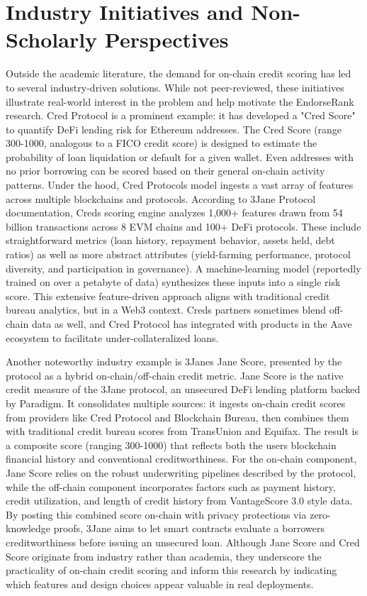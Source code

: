 \documentclass[
]{article}
\begin{document}
\section{Industry Initiatives and Non-Scholarly Perspectives}\label{industry-initiatives-and-non-scholarly-perspectives}

Outside the academic literature, the demand for on-chain credit scoring has led to several industry-driven solutions. While not peer-reviewed, these initiatives illustrate real-world interest in the problem and help motivate the EndorseRank research. Cred Protocol is a prominent example: it has developed a "Cred Score" to quantify DeFi lending risk for Ethereum addresses. The Cred Score (range 300-1000, analogous to a FICO credit score) is designed to estimate the probability of loan liquidation or default for a given wallet. Even addresses with no prior borrowing can be scored based on their general on-chain activity patterns. Under the hood, Cred Protocol\textquotesingle s model ingests a vast array of features across multiple blockchains and protocols. According to 3Jane Protocol documentation, Cred\textquotesingle s scoring engine analyzes 1,000+ features drawn from 54 billion transactions across 8 EVM chains and 100+ DeFi protocols. These include straightforward metrics (loan history, repayment behavior, assets held, debt ratios) as well as more abstract attributes (yield-farming performance, protocol diversity, and participation in governance). A machine-learning model (reportedly trained on over a petabyte of data) synthesizes these inputs into a single risk score. This extensive feature-driven approach aligns with traditional credit bureau analytics, but in a Web3 context. Cred\textquotesingle s partners sometimes blend off-chain data as well, and Cred Protocol has integrated with products in the Aave ecosystem to facilitate under-collateralized loans.

Another noteworthy industry example is 3Jane\textquotesingle s Jane Score, presented by the protocol as a hybrid on-chain/off-chain credit metric. Jane Score is the native credit measure of the 3Jane protocol, an unsecured DeFi lending platform backed by Paradigm. It consolidates multiple sources: it ingests on-chain credit scores from providers like Cred Protocol and Blockchain Bureau, then combines them with traditional credit bureau scores from TransUnion and Equifax. The result is a composite score (ranging 300-1000) that reflects both the user\textquotesingle s blockchain financial history and conventional creditworthiness. For the on-chain component, Jane Score relies on the robust underwriting pipelines described by the protocol, while the off-chain component incorporates factors such as payment history, credit utilization, and length of credit history from VantageScore 3.0 style data. By posting this combined score on-chain with privacy protections via zero-knowledge proofs, 3Jane aims to let smart contracts evaluate a borrower\textquotesingle s creditworthiness before issuing an unsecured loan. Although Jane Score and Cred Score originate from industry rather than academia, they underscore the practicality of on-chain credit scoring and inform this research by indicating which features and design choices appear valuable in real deployments.
\end{document}
